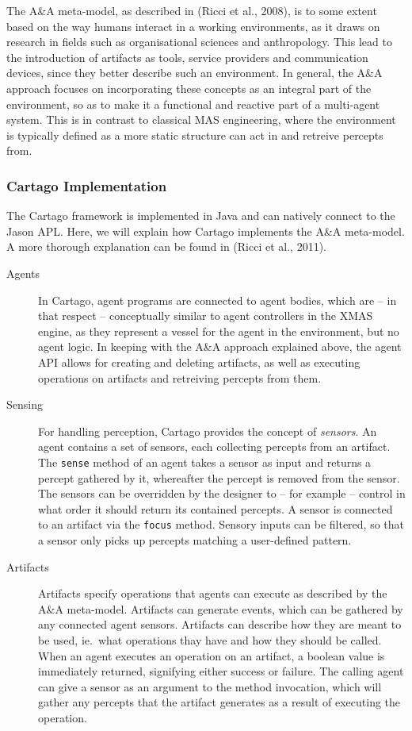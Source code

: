 The A\&A meta-model, as described in (Ricci et al., 2008), is to some
extent based on the way humans interact in a working environments,
as it draws on research in fields such as organisational sciences
and anthropology. This lead to the introduction of artifacts as tools,
service providers and communication devices, since they better describe
such an environment. In general, the A\&A approach focuses on incorporating
these concepts as an integral part of the environment, so as to make
it a functional and reactive part of a multi-agent system. This is
in contrast to classical MAS engineering, where the environment is
typically defined as a more static structure can act in and retreive
percepts from.


\subsubsection*{Cartago Implementation}

The Cartago framework is implemented in Java and can natively connect
to the Jason APL. Here, we will explain how Cartago implements the
A\&A meta-model. A more thorough explanation can be found in (Ricci
et al., 2011).
\begin{description}
\item [{Agents}] In Cartago, agent programs are connected to agent bodies,
which are -- in that respect -- conceptually similar to agent controllers
in the XMAS engine, as they represent a vessel for the agent in the
environment, but no agent logic. In keeping with the A\&A approach
explained above, the agent API allows for creating and deleting artifacts,
as well as executing operations on artifacts and retreiving percepts
from them. 
\item [{Sensing}] For handling perception, Cartago provides the concept
of \emph{sensors}. An agent contains a set of sensors, each collecting
percepts from an artifact. The \texttt{sense} method of an agent takes
a sensor as input and returns a percept gathered by it, whereafter
the percept is removed from the sensor. The sensors can be overridden
by the designer to -- for example -- control in what order it should
return its contained percepts. A sensor is connected to an artifact
via the \texttt{focus} method. Sensory inputs can be filtered, so
that a sensor only picks up percepts matching a user-defined pattern.
\item [{Artifacts}] Artifacts specify operations that agents can execute
as described by the A\&A meta-model. Artifacts can generate events,
which can be gathered by any connected agent sensors. Artifacts can
describe how they are meant to be used, ie.\ what operations thay
have and how they should be called. When an agent executes an operation
on an artifact, a boolean value is immediately returned, signifying
either success or failure. The calling agent can give a sensor as
an argument to the method invocation, which will gather any percepts
that the artifact generates as a result of executing the operation.
\end{description}

